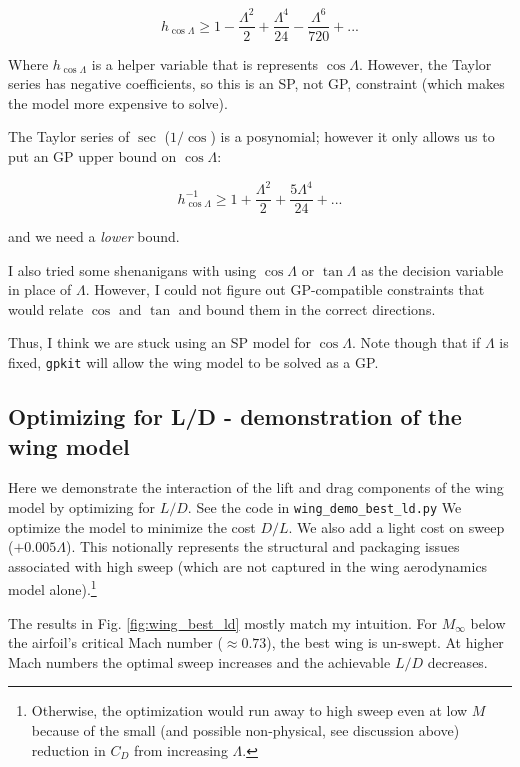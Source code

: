 \documentclass[12pt]{article}
\begin{document}
\begin{equation}
h_{\cos\Lambda} \geq 1 - \frac{\Lambda^2}{2} + \frac{\Lambda^4}{24} -  \frac{\Lambda^6}{720} + ...
\end{equation}

Where $h_{\cos\Lambda}$ is a helper variable that is represents $\cos\Lambda$. However, the Taylor series has negative coefficients, so this is an SP, not GP, constraint (which makes the model more expensive to solve).

The Taylor series of $\sec$ ($1/\cos$) is a posynomial; however it only allows us to put an GP upper bound on $\cos\Lambda$:

\begin{equation}
h_{\cos\Lambda}^{-1} \geq 1 + \frac{\Lambda^2}{2} + \frac{5 \Lambda^4}{24} + ...
\end{equation}

and we need a \emph{lower} bound.

I also tried some shenanigans with using $\cos\Lambda$ or $\tan\Lambda$ as the decision variable in place of $\Lambda$. However, I could not figure out GP-compatible constraints that would relate $\cos$ and $\tan$ and bound them in the correct directions.

Thus, I think we are stuck using an SP model for $\cos\Lambda$. Note though that if $\Lambda$ is fixed, \texttt{gpkit} will allow the wing model to be solved as a GP.


\subsection{Optimizing for L/D - demonstration of the wing model}
Here we demonstrate the interaction of the lift and drag components of the wing model by optimizing for $L/D$. See the code in \texttt{wing\_demo\_best\_ld.py} We optimize the model to minimize the cost $D/L$. We also add a light cost on sweep ($+ 0.005\Lambda$). This notionally represents the structural and packaging issues associated with high sweep (which are not captured in the wing aerodynamics model alone).\footnote{Otherwise, the optimization would run away to high sweep even at low $M$ because of the small (and possible non-physical, see discussion above) reduction in $C_D$ from increasing $\Lambda$.}

The results in Fig. \ref{fig:wing_best_ld} mostly match my intuition. For $M_\infty$ below the airfoil's critical Mach number ($\approx 0.73$), the best wing is un-swept. At higher Mach numbers the optimal sweep increases and the achievable $L/D$ decreases.
\end{document}
